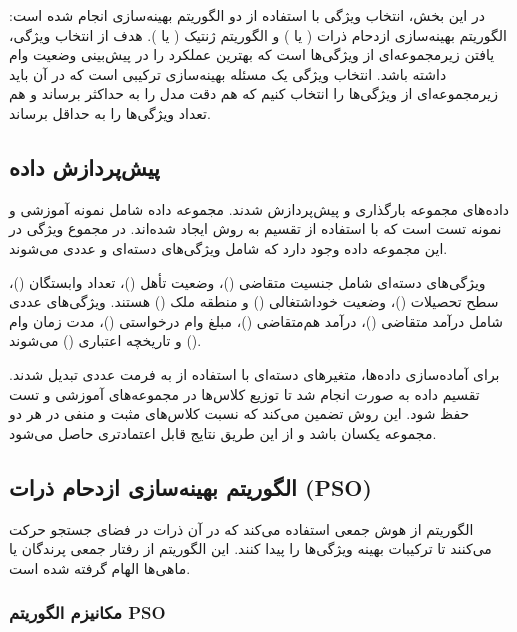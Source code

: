 \documentclass{article}
\begin{document}
در این بخش، انتخاب ویژگی با استفاده از دو الگوریتم بهینه‌سازی انجام شده است: الگوریتم بهینه‌سازی ازدحام ذرات ( یا ) و الگوریتم ژنتیک ( یا ). هدف از انتخاب ویژگی، یافتن زیرمجموعه‌ای از ویژگی‌ها است که بهترین عملکرد را در پیش‌بینی وضعیت وام داشته باشد. انتخاب ویژگی یک مسئله بهینه‌سازی ترکیبی است که در آن باید زیرمجموعه‌ای از ویژگی‌ها را انتخاب کنیم که هم دقت مدل را به حداکثر برساند و هم تعداد ویژگی‌ها را به حداقل برساند.

\subsection{پیش‌پردازش داده}

داده‌های مجموعه  بارگذاری و پیش‌پردازش شدند. مجموعه داده شامل  نمونه آموزشی و  نمونه تست است که با استفاده از تقسیم  به روش  ایجاد شده‌اند. در مجموع  ویژگی در این مجموعه داده وجود دارد که شامل ویژگی‌های دسته‌ای و عددی می‌شوند.

ویژگی‌های دسته‌ای شامل جنسیت متقاضی ()، وضعیت تأهل ()، تعداد وابستگان ()، سطح تحصیلات ()، وضعیت خوداشتغالی () و منطقه ملک () هستند. ویژگی‌های عددی شامل درآمد متقاضی ()، درآمد هم‌متقاضی ()، مبلغ وام درخواستی ()، مدت زمان وام () و تاریخچه اعتباری () می‌شوند.

برای آماده‌سازی داده‌ها، متغیرهای دسته‌ای با استفاده از  به فرمت عددی تبدیل شدند. تقسیم داده به صورت  انجام شد تا توزیع کلاس‌ها در مجموعه‌های آموزشی و تست حفظ شود. این روش تضمین می‌کند که نسبت کلاس‌های مثبت و منفی در هر دو مجموعه یکسان باشد و از این طریق نتایج قابل اعتمادتری حاصل می‌شود.

\subsection{الگوریتم بهینه‌سازی ازدحام ذرات (PSO)}

الگوریتم  از هوش جمعی استفاده می‌کند که در آن ذرات در فضای جستجو حرکت می‌کنند تا ترکیبات بهینه ویژگی‌ها را پیدا کنند. این الگوریتم از رفتار جمعی پرندگان یا ماهی‌ها الهام گرفته شده است.

\subsubsection{مکانیزم الگوریتم PSO}
\end{document}
